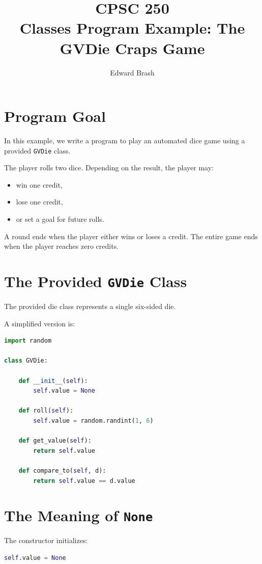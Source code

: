 \documentclass[11pt]{article}
\title{CPSC 250 \\ Classes Program Example: The GVDie Craps Game}
\author{Edward Brash}
\date{}
\begin{document}
\maketitle

\section{Program Goal}

In this example, we write a program to play an automated dice game using a provided \texttt{GVDie} class.

The player rolls two dice. Depending on the result, the player may:

\begin{itemize}
    \item win one credit,
    \item lose one credit,
    \item or set a goal for future rolls.
\end{itemize}

A round ends when the player either wins or loses a credit. The entire game ends when the player reaches zero credits.

\section{The Provided \texttt{GVDie} Class}

The provided die class represents a single six-sided die.

A simplified version is:

\begin{lstlisting}[language=Python]
import random

class GVDie:

    def __init__(self):
        self.value = None

    def roll(self):
        self.value = random.randint(1, 6)

    def get_value(self):
        return self.value

    def compare_to(self, d):
        return self.value == d.value
\end{lstlisting}

\section{The Meaning of \texttt{None}}

The constructor initializes:

\begin{lstlisting}[language=Python]
self.value = None
\end{lstlisting}
\end{document}
